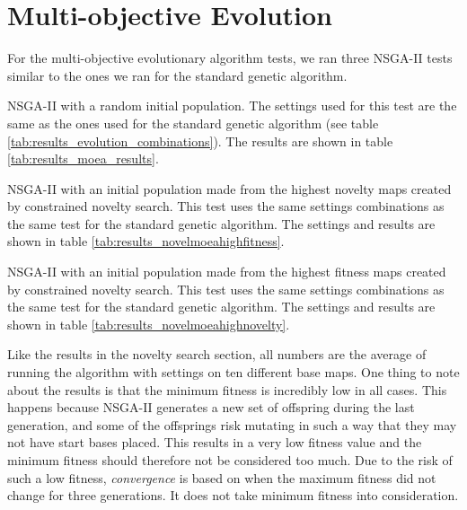 \section{Multi-objective Evolution}
\label{results_moea}

For the multi-objective evolutionary algorithm tests, we ran three NSGA-II tests similar to the ones we ran for the standard genetic algorithm.

\begin{my_itemize}

	\item NSGA-II with a random initial population. The settings used for this test are the same as the ones used for the standard genetic algorithm (see table \ref{tab:results_evolution_combinations}). The results are shown in table \ref{tab:results_moea_results}.

	\item NSGA-II with an initial population made from the highest novelty maps created by constrained novelty search. This test uses the same settings combinations as the same test for the standard genetic algorithm. The settings and results are shown in table \ref{tab:results_novelmoeahighfitness}.

	\item NSGA-II with an initial population made from the highest fitness maps created by constrained novelty search. This test uses the same settings combinations as the same test for the standard genetic algorithm. The settings and results are shown in table \ref{tab:results_novelmoeahighnovelty}.

\end{my_itemize}

Like the results in the novelty search section, all numbers are the average of running the algorithm with settings on ten different base maps. One thing to note about the results is that the minimum fitness is incredibly low in all cases. This happens because NSGA-II generates a new set of offspring during the last generation, and some of the offsprings risk mutating in such a way that they may not have start bases placed. This results in a very low fitness value and the minimum fitness should therefore not be considered too much. Due to the risk of such a low fitness, \textit{convergence} is based on when the maximum fitness did not change for three generations. It does not take minimum fitness into consideration.


